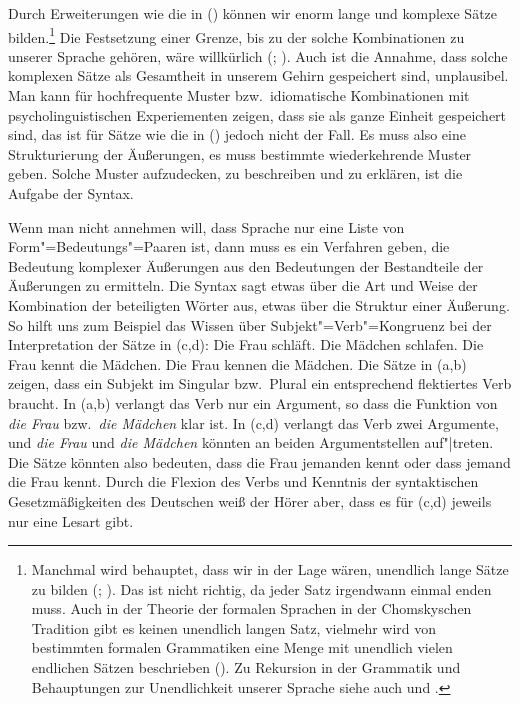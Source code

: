Durch Erweiterungen wie die in () können wir enorm lange und komplexe Sätze bilden.\footnote{
Manchmal wird behauptet, dass wir in der Lage wären, unendlich lange Sätze zu bilden (\citealp*[]{NKN2001a}; \citealp[]{KS2008a-u}). Das ist nicht richtig, da jeder Satz irgendwann einmal enden
 muss. Auch in der Theorie der formalen Sprachen in der Chomskyschen Tradition gibt es keinen
 unendlich langen Satz, vielmehr wird von bestimmten formalen Grammatiken eine Menge mit unendlich
 vielen endlichen Sätzen beschrieben (\citealp[]{Chomsky57a}). Zu Rekursion in
 der Grammatik und Behauptungen zur Unendlichkeit unserer Sprache siehe auch  und
 .
} Die Festsetzung einer Grenze, bis zu der solche Kombinationen zu unserer Sprache gehören, wäre
willkürlich (\citealp[]{Harris57a}; \citealp[]{Chomsky57a}). Auch ist die Annahme, dass
solche komplexen Sätze als Gesamtheit in unserem Gehirn gespeichert sind, unplausibel. Man kann für
hochfrequente Muster bzw.\ idiomatische Kombinationen mit psycholinguistischen Experiementen zeigen,
dass sie als ganze Einheit gespeichert sind, das ist für Sätze wie die in () jedoch nicht der
Fall. Es muss also eine Strukturierung der Äußerungen, es muss bestimmte wiederkehrende Muster
geben. Solche Muster aufzudecken, zu beschreiben und zu erklären, ist die Aufgabe der Syntax.

Wenn man nicht annehmen will, dass Sprache nur eine Liste von Form"=Bedeutungs"=Paaren
ist, dann muss es ein Verfahren geben, die Bedeutung komplexer Äußerungen aus
den Bedeutungen der Bestandteile der Äußerungen zu ermitteln.
Die Syntax sagt etwas über die Art und Weise der Kombination der beteiligten
Wörter aus, etwas über die Struktur einer Äußerung.
So hilft uns zum Beispiel das Wissen über Subjekt"=Verb"=Kongruenz bei der Interpretation
der Sätze in (c,d):
\eal
\ex Die Frau schläft.
\ex Die Mädchen schlafen.
\ex Die Frau kennt  die Mädchen.
\ex Die Frau kennen die Mädchen.
\zl
Die Sätze in (a,b) zeigen, dass ein Subjekt im Singular bzw.\ Plural
ein entsprechend flektiertes Verb braucht. In (a,b) verlangt das Verb nur ein
Argument, so dass die Funktion von \emph{die Frau} bzw.\ \emph{die Mädchen} klar ist.
In (c,d) verlangt das Verb zwei Argumente, und \emph{die Frau} und \emph{die Mädchen}
könnten an beiden Argumentstellen auf"|treten. Die Sätze könnten also bedeuten, dass
die Frau jemanden kennt oder dass jemand die Frau kennt. Durch die Flexion des Verbs und
Kenntnis der syntaktischen Gesetzmäßigkeiten des Deutschen weiß der Hörer
aber, dass es für (c,d) jeweils nur eine Lesart gibt.



